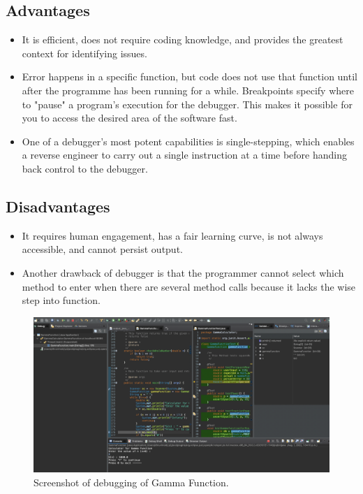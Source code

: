 \documentclass[12pt,a4paper]{report}
\begin{document}
\subsection{Advantages}
\begin{itemize}
    
    \item{It is efficient, does not require coding knowledge, and provides the greatest context for identifying issues.}
    
    \item{Error happens in a specific function, but code does not use that function until after the programme has been running for a while. Breakpoints specify where to "pause" a program's execution for the debugger. This makes it possible for you to access the desired area of the software fast.}
    
    \item{One of a debugger's most potent capabilities is single-stepping, which enables a reverse engineer to carry out a single instruction at a time before handing back control to the debugger.}
\end{itemize}

\subsection{Disadvantages}
\begin{itemize}
    \item{It requires human engagement, has a fair learning curve, is not always accessible, and cannot persist output.}
    
    \item{Another drawback of debugger is that the programmer cannot select which method to enter when there are several method calls because it lacks the wise step into function.}
\end{itemize}

\begin{figure}[h]
    \centering
    \includegraphics[width=0.9\linewidth]{Images/Debugger.jpg}
    \caption{Screenshot of debugging of Gamma Function.}
    \label{fig:Debugger}
\end{figure}
\end{document}
